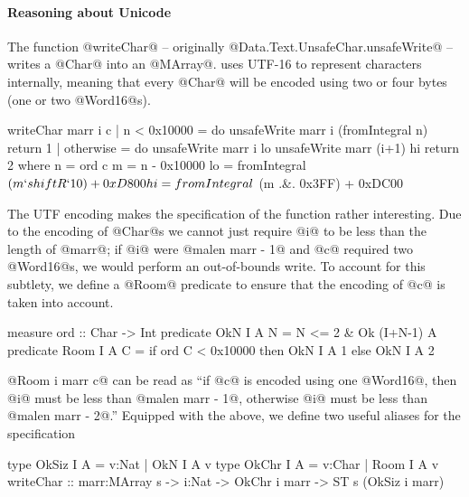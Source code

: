 \paragraph{Reasoning about Unicode}
The function @writeChar@ -- originally
@Data.Text.UnsafeChar.unsafeWrite@ --
writes a @Char@ into an @MArray@.
\libtext uses UTF-16 to represent characters internally,
meaning that every @Char@ will be encoded using two or 
four bytes (one or two @Word16@s).
%
\begin{code}
writeChar marr i c
    | n < 0x10000 = do
        unsafeWrite marr i (fromIntegral n)
        return 1
    | otherwise = do
        unsafeWrite marr i lo
        unsafeWrite marr (i+1) hi
        return 2
    where n = ord c
          m = n - 0x10000
          lo = fromIntegral
             $ (m `shiftR` 10) + 0xD800
          hi = fromIntegral
             $ (m .&. 0x3FF) + 0xDC00
\end{code}
%
The UTF encoding makes the specification of the function 
rather interesting.
Due to the encoding of @Char@s we cannot just require 
@i@ to be less than the length of @marr@; if @i@ were 
@malen marr - 1@ and @c@ required two @Word16@s, we 
would perform an out-of-bounds write. 
%
To account for this subtlety, we define a @Room@ predicate
to ensure that the encoding of @c@ is taken into account.
%
\begin{code}
measure ord         :: Char -> Int
predicate OkN I A N  = N <= 2 & Ok (I+N-1) A
predicate Room I A C = if ord C <  0x10000
                       then OkN I A 1
                       else OkN I A 2
\end{code}
%
@Room i marr c@ can be read as 
``if @c@ is encoded using one @Word16@, 
  then @i@ must be less than @malen marr - 1@, 
  otherwise @i@ must be less than @malen marr - 2@.'' 
%
Equipped with the above, we define two useful aliases for the specification
%
\begin{code}
type OkSiz I A = {v:Nat  | OkN  I A v}
type OkChr I A = {v:Char | Room I A v}
writeChar     :: marr:MArray s
              -> i:Nat
              -> OkChr i marr
              -> ST s (OkSiz i marr)
\end{code}


